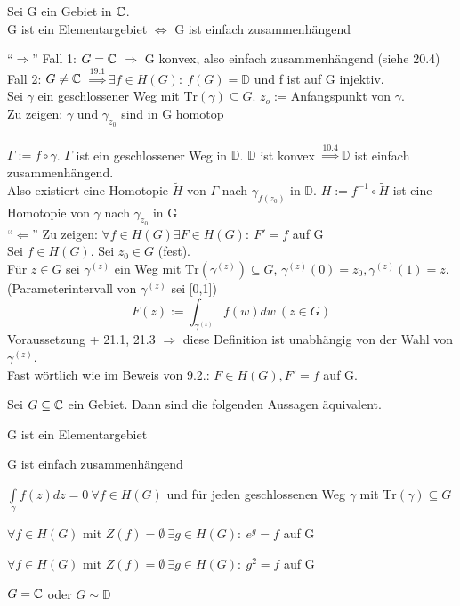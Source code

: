 \documentclass[a4paper,twoside,DIV15,BCOR12mm]{scrbook}
\def\MdD{\mathbb{D}}
\def\Tr{\text{Tr}}
\def\wegint{\ensuremath{\int\limits_\gamma}}
\begin{document}
\begin{satz} 
Sei G ein Gebiet in $\mathbb{C}$.\\
G ist ein Elementargebiet $\Leftrightarrow$ G ist einfach zusammenhängend
\end{satz}
\begin{beweis}
"`$\Rightarrow$"' Fall 1: $G=\mathbb{C}$ $\Rightarrow$ G konvex, also einfach zusammenhängend (siehe 20.4)\\
Fall 2: $G\neq\mathbb{C}$ $\stackrel{19.1}{\Rightarrow}\exists f\in H(G):\ f(G)=\MdD$ und f ist auf G injektiv.\\
Sei $\gamma$ ein geschlossener Weg mit $\Tr(\gamma)\subseteq G$. $z_o:=$Anfangspunkt von $\gamma$.\\
Zu zeigen: $\gamma$ und $\gamma_{z_0}$ sind in G homotop\\
~\\
$\Gamma:=f\circ\gamma$. $\Gamma$ ist ein geschlossener Weg in $\MdD$. $\MdD$ ist konvex $\stackrel{10.4}{\Rightarrow}\MdD$ ist einfach zusammenhängend.\\
Also existiert eine Homotopie $\tilde{H}$ von $\Gamma$ nach $\gamma_{f(z_0)}$ in $\MdD$. $H:=f^{-1}\circ\tilde{H}$ ist eine Homotopie von $\gamma$ nach $\gamma_{z_0}$ in G\\
"`$\Leftarrow$"' Zu zeigen: $\forall f\in H(G)\exists F\in H(G):\ F'=f$ auf G\\
Sei $f\in H(G)$. Sei $z_0\in G$ (fest).\\
Für $z\in G$ sei $\gamma^{(z)}$ ein Weg mit $\Tr(\gamma^{(z)})\subseteq G$, $\gamma^{(z)}(0)=z_0, \gamma^{(z)}(1)=z$. (Parameterintervall von $\gamma^{(z)}$ sei [0,1])\\
\[F(z):=\int_{\gamma^{(z)}}f(w)dw\ (z\in G)\]
Voraussetzung + 21.1, 21.3 $\Rightarrow$ diese Definition ist unabhängig von der Wahl von $\gamma^{(z)}$.\\
Fast wörtlich wie im Beweis von 9.2.: $F\in H(G), F'=f$ auf G.
\end{beweis}
\begin{satz}
Sei $G\subseteq\mathbb{C}$ ein Gebiet. Dann sind die folgenden Aussagen äquivalent.
\begin{liste}
\item G ist ein Elementargebiet
\item G ist einfach zusammenhängend
\item $\wegint f(z)dz=0\ \forall f\in H(G)$ und für jeden geschlossenen Weg $\gamma$ mit $\Tr(\gamma)\subseteq G$
\item $\forall f\in H(G)$ mit $Z(f)=\emptyset\ \exists g\in H(G):\ e^g=f$ auf G
\item $\forall f\in H(G)$ mit $Z(f)=\emptyset\ \exists g\in H(G):\ g^2=f$ auf G
\item $G=\mathbb{C}$ oder $G\sim \MdD$
\end{liste}
\end{satz}
\end{document}
